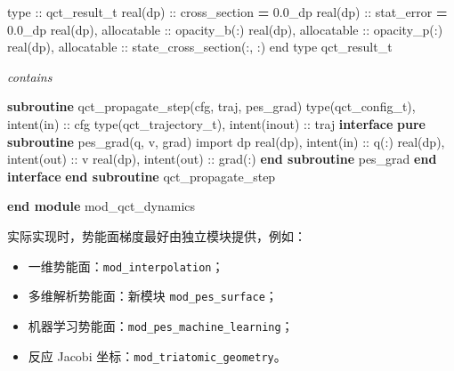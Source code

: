 \documentclass[
]{ctexbook}
\newenvironment{Shaded}{}{}
\newcommand{\CommentTok}[1]{\textcolor[rgb]{0.38,0.63,0.69}{\textit{#1}}}
\newcommand{\DataTypeTok}[1]{\textcolor[rgb]{0.56,0.13,0.00}{#1}}
\newcommand{\FloatTok}[1]{\textcolor[rgb]{0.25,0.63,0.44}{#1}}
\newcommand{\KeywordTok}[1]{\textcolor[rgb]{0.00,0.44,0.13}{\textbf{#1}}}
\newcommand{\NormalTok}[1]{#1}
\providecommand{\tightlist}{%
  \setlength{\itemsep}{0pt}\setlength{\parskip}{0pt}}
\begin{document}
\begin{Shaded}
\begin{Highlighting}[]
    \DataTypeTok{type} \DataTypeTok{::}\NormalTok{ qct\_result\_t}
\DataTypeTok{        real(dp)} \DataTypeTok{::}\NormalTok{ cross\_section }\KeywordTok{=} \FloatTok{0.0\_dp}
\DataTypeTok{        real(dp)} \DataTypeTok{::}\NormalTok{ stat\_error }\KeywordTok{=} \FloatTok{0.0\_dp}
\DataTypeTok{        real(dp)}\NormalTok{, }\DataTypeTok{allocatable} \DataTypeTok{::}\NormalTok{ opacity\_b(:)}
\DataTypeTok{        real(dp)}\NormalTok{, }\DataTypeTok{allocatable} \DataTypeTok{::}\NormalTok{ opacity\_p(:)}
\DataTypeTok{        real(dp)}\NormalTok{, }\DataTypeTok{allocatable} \DataTypeTok{::}\NormalTok{ state\_cross\_section(:, :)}
    \DataTypeTok{end type}\NormalTok{ qct\_result\_t}

\CommentTok{contains}

    \KeywordTok{subroutine}\NormalTok{ qct\_propagate\_step(cfg, traj, pes\_grad)}
        \DataTypeTok{type(qct\_config\_t)}\NormalTok{, }\DataTypeTok{intent(in)} \DataTypeTok{::}\NormalTok{ cfg}
        \DataTypeTok{type(qct\_trajectory\_t)}\NormalTok{, }\DataTypeTok{intent(inout)} \DataTypeTok{::}\NormalTok{ traj}
        \KeywordTok{interface}
            \KeywordTok{pure} \KeywordTok{subroutine}\NormalTok{ pes\_grad(q, v, grad)}
\NormalTok{                import dp}
\DataTypeTok{                real(dp)}\NormalTok{, }\DataTypeTok{intent(in)} \DataTypeTok{::}\NormalTok{ q(:)}
\DataTypeTok{                real(dp)}\NormalTok{, }\DataTypeTok{intent(out)} \DataTypeTok{::}\NormalTok{ v}
\DataTypeTok{                real(dp)}\NormalTok{, }\DataTypeTok{intent(out)} \DataTypeTok{::}\NormalTok{ grad(:)}
            \KeywordTok{end subroutine}\NormalTok{ pes\_grad}
        \KeywordTok{end interface}
    \KeywordTok{end subroutine}\NormalTok{ qct\_propagate\_step}

\KeywordTok{end module}\NormalTok{ mod\_qct\_dynamics}
\end{Highlighting}
\end{Shaded}

实际实现时，势能面梯度最好由独立模块提供，例如：

\begin{itemize}
\tightlist
\item
  一维势能面：\texttt{mod\_interpolation}；
\item
  多维解析势能面：新模块 \texttt{mod\_pes\_surface}；
\item
  机器学习势能面：\texttt{mod\_pes\_machine\_learning}；
\item
  反应 Jacobi 坐标：\texttt{mod\_triatomic\_geometry}。
\end{itemize}
\end{document}
